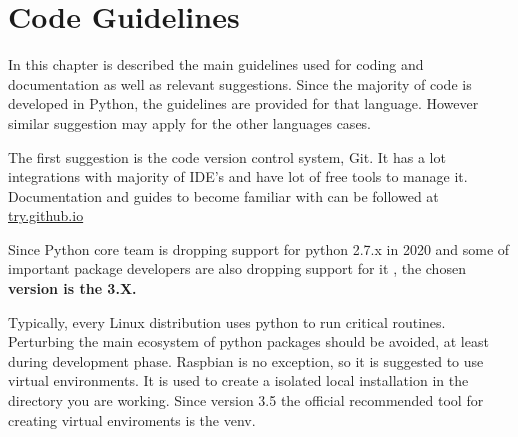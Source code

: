 \chapter{Code Guidelines}
In this chapter is described the main guidelines used for coding and documentation as well as relevant suggestions.
Since the majority of code is developed in Python, the guidelines are provided for that language. However similar suggestion may apply for the other languages cases.

The first suggestion is the code version control system, Git. It has a lot integrations with majority of IDE's and have lot of free tools to manage it. Documentation and guides to become familiar with can be followed at \href{https://try.github.io/}{try.github.io}
 

Since Python core team is dropping support for python 2.7.x in 2020 \cite{python_end_of_life} and some of important package developers are also dropping support for it \cite{numpy_end_of_life}, the chosen \textbf{version is the 3.X.}

Typically, every Linux distribution uses python to run critical routines. Perturbing the main ecosystem of python packages should be avoided, at least during development phase. Raspbian is no exception, so it is suggested to use virtual environments. It is used to create a isolated local installation in the directory you are working. Since version 3.5 the official recommended tool for creating virtual enviroments is the venv.



